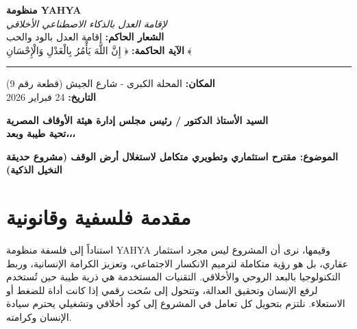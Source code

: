 \documentclass[12pt, a4paper]{article}
\begin{document}
\begin{center}
    \textbf{\LARGE منظومة YAHYA} \\
    \vspace{0.2cm}
    \textit{لإقامة العدل بالذكاء الاصطناعي الأخلاقي} \\
    \vspace{0.4cm}
    \textbf{الشعار الحاكم:} إقامة العدل بالود والحب \\
    \vspace{0.2cm}
    \textbf{الآية الحاكمة:} ﴿ إِنَّ اللَّهَ يَأْمُرُ بِالْعَدْلِ وَالْإِحْسَانِ ﴾
\end{center}

\vspace{0.5cm}
\hrule
\vspace{0.5cm}

\begin{flushright}
    \textbf{المكان:} المحلة الكبرى - شارع الجيش (قطعة رقم 9) \\
    \textbf{التاريخ:} 24 فبراير 2026
\end{flushright}

\vspace{0.5cm}

\noindent \textbf{السيد الأستاذ الدكتور / رئيس مجلس إدارة هيئة الأوقاف المصرية} \\
\noindent \textbf{تحية طيبة وبعد،،،}

\vspace{0.3cm}

\begin{center}
    \textbf{\Large الموضوع: مقترح استثماري وتطويري متكامل لاستغلال أرض الوقف (مشروع حديقة النخيل الذكية)}
\end{center}

\vspace{0.5cm}

\section*{مقدمة فلسفية وقانونية}

استناداً إلى فلسفة منظومة YAHYA وقيمها، نرى أن المشروع ليس مجرد استثمار عقاري، بل هو رؤية متكاملة لترميم الانكسار الاجتماعي، وتعزيز الكرامة الإنسانية، وربط التكنولوجيا بالبعد الروحي والأخلاقي.  
التقنيات المستخدمة هي ذرية طيبة حين تُستخدم لرفع الإنسان وتحقيق العدالة، وتتحول إلى سُحت رقمي إذا كانت أداة للضغط أو الاستعلاء.  
نلتزم بتحويل كل تعامل في المشروع إلى كود أخلاقي وتشغيلي يحترم سيادة الإنسان وكرامته.

\vspace{0.5cm}
\end{document}
